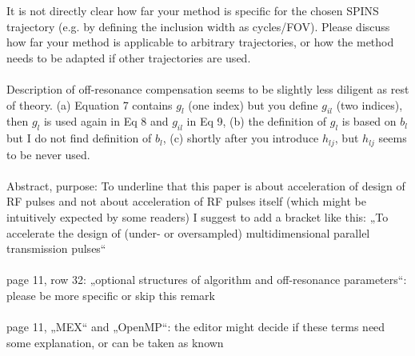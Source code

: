 \documentclass[11pt]{article}
\begin{document}
 It is not directly clear how far your method is specific for the chosen SPINS trajectory (e.g. by defining the inclusion width as cycles/FOV). Please discuss how far your method is applicable to arbitrary trajectories, or how the method needs to be adapted if other trajectories are used.
\\[0.2em]
\indent{\it \textcolor{blue}{The algorithm makes no assumptions about the specific trajectory used, 
and we have clarified this in the Discussion.
The code we provide should work for any 2D or 3D trajectory, and could be extended to any number of dimensions. 
We have also clarified in the Theory section that by `cycles/FOV' we mean phase cycles over the excitation FOV;
this is a general measure that is not specific to the SPINS trajectory.}}
\\[1.2em]

 Description of off-resonance compensation seems to be slightly less diligent as rest of theory. (a) Equation 7 contains $g_l$ (one index) but you define $g_{il}$ (two indices), then $g_l$ is used again in Eq 8 and $g_{il}$ in Eq 9, (b) the definition of $g_l$ is based on $b_l$ but I do not find definition of $b_l$, (c) shortly after you introduce $h_{lj}$, but $h_{lj}$ seems to be never used.
\\[0.2em]
\indent{\it \textcolor{blue}{Thank you for noticing the inconsistencies in this section; we agree and have revised the section to simplify and clarify it.}}
\\[1.2em]

 Abstract, purpose: To underline that this paper is about acceleration of design of RF pulses and not about acceleration of RF pulses itself (which might be intuitively expected by some readers) I suggest to add a bracket like this: „To accelerate the design of (under- or oversampled) multidimensional parallel transmission pulses“
\\[0.2em]
\indent{\it \textcolor{blue}{We agree and have made this addition.}}
\\[1.2em]

 page 11, row 32: „optional structures of algorithm and off-resonance parameters“: please be more specific or skip this remark
\\[0.2em]
\indent{\it \textcolor{blue}{We have skipped this remark to save word count.}}
\\[1.2em]

 page 11, „MEX“ and „OpenMP“: the editor might decide if these terms need some explanation, or can be taken as known
\\[0.2em]
\indent{\it \textcolor{blue}{We have defined each of these acronyms.}}
\\[1.2em]
\end{document}
